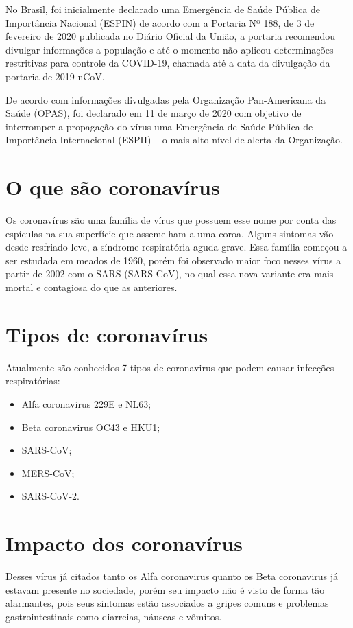 No Brasil, foi inicialmente declarado uma Emergência de Saúde Pública de Importância Nacional (ESPIN) de acordo com a Portaria Nº 188, de 3 de fevereiro de 2020 publicada no Diário Oficial da União, a portaria recomendou divulgar informações a população e até o momento não aplicou determinações restritivas para controle da COVID-19, chamada até a data da divulgação da portaria de  2019-nCoV.

De acordo com informações divulgadas pela Organização Pan-Americana da Saúde (OPAS), foi declarado em 11 de março de 2020 com objetivo de interromper a propagação do vírus uma Emergência de Saúde Pública de Importância Internacional (ESPII) – o mais alto nível de alerta da Organização.  


\section{O que são coronavírus}

Os coronavírus são uma família de vírus que possuem esse nome por conta das espículas na sua superfície que assemelham a uma coroa. Alguns sintomas vão desde resfriado leve, a síndrome respiratória aguda grave. Essa família começou a ser estudada em meados de 1960,  porém foi observado maior foco nesses vírus a partir de 2002 com o SARS (SARS-CoV), no qual essa nova variante era mais mortal e contagiosa do que as anteriores. 

\section{Tipos de coronavírus}

Atualmente são conhecidos 7 tipos de coronavirus que podem causar infecções respiratórias:

\begin{itemize}
\item Alfa coronavirus 229E e NL63;
\item Beta coronavirus OC43 e HKU1;
\item SARS-CoV;
\item MERS-CoV;
\item SARS-CoV-2.
\end{itemize}

\section{Impacto dos coronavírus }

Desses vírus já citados tanto os Alfa coronavirus quanto os Beta coronavirus já estavam presente no sociedade, porém seu impacto não é visto de forma tão alarmantes, pois seus sintomas estão associados a gripes comuns e problemas gastrointestinais como diarreias, náuseas e vômitos.

